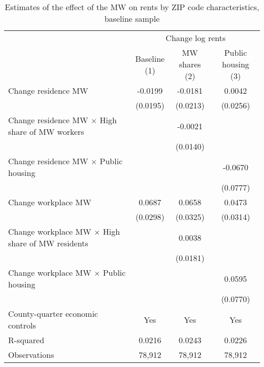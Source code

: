 \begin{table}[hbt!] \centering
    \caption{Estimates of the effect of the MW on rents by ZIP code characteristics, baseline sample}
    \label{tab:heterogeneity}
    \begin{tabular}{@{}lccc@{}}
        \toprule
            & \multicolumn{3}{c}{Change log rents}                                                  \\ \cmidrule(l){2-4} 
            & \shortstack{Baseline\\(1)} 
            & \shortstack{MW shares\\(2)}                                             
            & \shortstack{Public housing\\(3)}                                                      \\ \midrule
        Change residence MW                                     &  -0.0199   &  -0.0181  &  0.0042   \\
                                                                & (0.0195)  & (0.0213) & (0.0256)  \\
        Change residence MW $\times$ High share of MW workers   &        &  -0.0021  &        \\
                                                                &        & (0.0140) &        \\
        Change residence MW $\times$ Public housing             &        &       &  -0.0670   \\
                                                                &        &       & (0.0777)  \\
        Change workplace MW                                     &  0.0687   &  0.0658  &  0.0473   \\
                                                                & (0.0298)  & (0.0325) & (0.0314)  \\
        Change workplace MW $\times$ High share of MW residents &        &  0.0038  &        \\
                                                                &        & (0.0181) &        \\
        Change workplace MW $\times$ Public housing             &        &       &  0.0595   \\
                                                                &        &       & (0.0770)  \\
        County-quarter economic controls                        &  Yes   &  Yes  &   Yes  \\
        R-squared                                               &  0.0216   &  0.0243  &   0.0226  \\
        Observations                                            &  78,912  &  78,912 &   78,912 \\ \bottomrule
    \end{tabular}


\end{table}

